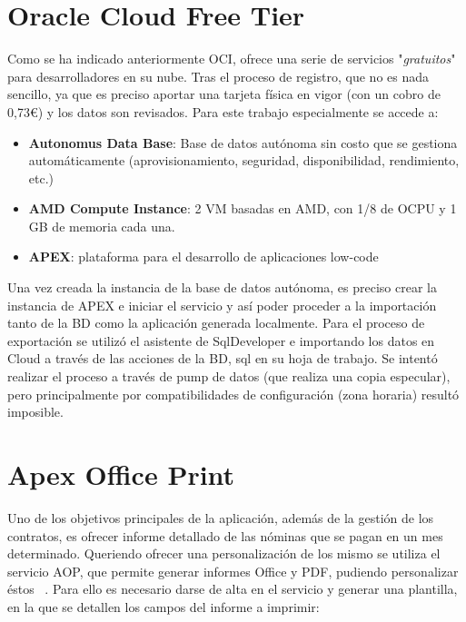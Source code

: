 \section{Oracle Cloud Free Tier}\label{sec: OFT}
Como se ha indicado anteriormente \acrshort{OCI}, ofrece una serie de servicios "\textit{gratuitos}" para desarrolladores en su nube. Tras el proceso de registro, que no es nada sencillo, ya que es preciso aportar una tarjeta física en vigor (con un cobro de 0,73€) y los datos son revisados. Para este trabajo especialmente se accede a:
\begin{itemize}
	\item \textbf{Autonomus Data Base}: Base de datos autónoma sin costo que se gestiona automáticamente (aprovisionamiento, seguridad, disponibilidad, rendimiento, etc.)
	\item \textbf{AMD Compute Instance}: 2 \acrshort{VM} basadas en AMD, con 1/8 de OCPU y 1 GB de memoria cada una.
	\item \textbf{\acrshort{APEX}}: plataforma para el desarrollo de aplicaciones low-code 
\end{itemize}

 \label{img: OCloud}

Una vez creada la instancia de la base de datos autónoma, es preciso crear la instancia de \acrshort{APEX} e iniciar el servicio y así poder proceder a la importación tanto de la BD como la aplicación generada localmente.
Para el proceso de exportación se utilizó el asistente de SqlDeveloper e importando los datos en Cloud a través de las acciones de la BD, sql en su hoja de trabajo. Se intentó realizar el proceso a través de pump de datos (que realiza una copia especular), pero principalmente por compatibilidades de configuración (zona horaria) resultó imposible.

\section{Apex Office Print}
Uno de los objetivos principales de la aplicación, además de la gestión de los contratos, es ofrecer informe detallado de las nóminas que se pagan en un mes determinado. Queriendo ofrecer una personalización de los mismo se utiliza el servicio \acrshort{AOP}, que permite generar informes Office y PDF, pudiendo personalizar éstos ~\cite{OverviewAPEXOffice}.
Para ello es necesario darse de alta en el servicio y generar una plantilla, en la que se detallen los campos del informe a imprimir:
\\
 \label{img:plantilla}

